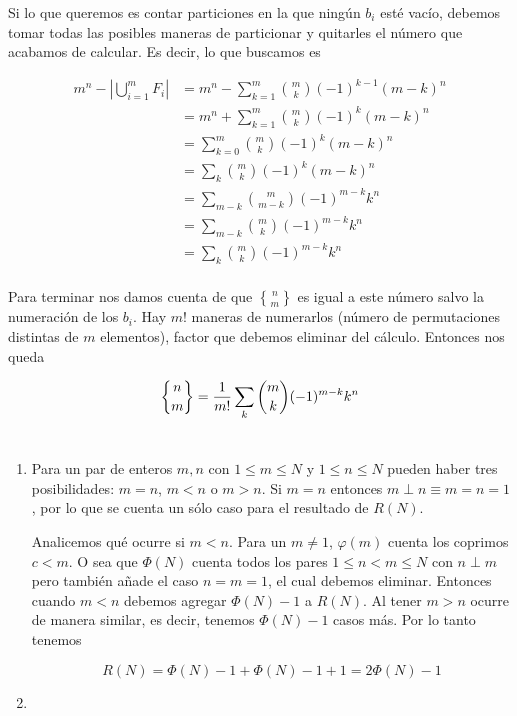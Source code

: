 \documentclass{article}
\newcommand{\stirlingD}[2]{\genfrac{\{}{\}}{0pt}{}{#1}{#2}}
\begin{document}
Si lo que queremos es contar particiones en la que ningún $b_i$ esté
vacío, debemos tomar todas las posibles maneras de particionar y quitarles el
número que acabamos de calcular. Es decir, lo que buscamos es

\begin{align*}
m^n - \left| \bigcup_{i=1}^m F_i \right|
  & = m^n - \sum_{k=1}^m \binom{m}{k} (-1)^{k-1} (m-k)^n \\
  & = m^n + \sum_{k=1}^m \binom{m}{k} (-1)^{k} (m-k)^n \\
  & = \sum_{k=0}^m \binom{m}{k} (-1)^{k} (m-k)^n \\
  & = \sum_k \binom{m}{k} (-1)^{k} (m-k)^n \\
  & = \sum_{m-k} \binom{m}{m-k} (-1)^{m-k} k^n \\
  & = \sum_{m-k} \binom{m}{k} (-1)^{m-k} k^n \\
  & = \sum_k \binom{m}{k} (-1)^{m-k} k^n \\
\end{align*}

Para terminar nos damos cuenta de que $\stirlingD{n}{m}$ es igual a este
número salvo la numeración de los $b_i$. Hay $m!$ maneras de numerarlos
(número de permutaciones distintas de $m$ elementos), factor que
debemos eliminar del cálculo. Entonces nos queda

\[
\stirlingD{n}{m} = \frac{1}{m!} \sum_k \binom{m}{k} (-1)^{m-k} k^n \\
\]

\section{}

\section{}

\renewcommand{\labelenumi}{(\alph{enumi})}
\begin{enumerate}

\item Para un par de enteros $m,n$ con $1 \leq m \leq N$ y $1 \leq n \leq N$
pueden haber tres posibilidades: $m=n$, $m<n$ o $m>n$. Si $m=n$ entonces
$m \perp n \equiv m=n=1$, por lo que se cuenta un sólo caso para el resultado de
$R(N)$.

Analicemos qué ocurre si $m<n$. Para un $m \neq 1$, $\varphi(m)$ cuenta
los coprimos $c < m$. O sea que $\Phi(N)$ cuenta todos los pares $1 \leq n < m
\leq N$ con $n \perp m$ pero también añade el caso $n=m=1$, el cual debemos
eliminar. Entonces cuando $m<n$ debemos agregar $\Phi(N)-1$ a $R(N)$.
Al tener $m>n$ ocurre de manera similar, es decir, tenemos $\Phi(N)-1$ casos
más. Por lo tanto tenemos

\[
R(N) = \Phi(N)-1 + \Phi(N)-1 + 1 = 2\Phi(N) - 1
\]

\item

\end{enumerate}

\section{}
\end{document}
